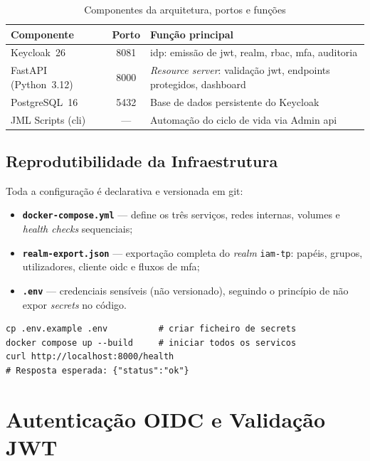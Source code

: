 \begin{table}[h!]
\centering
\caption{Componentes da arquitetura, portos e funções}
\label{tab:componentes}
\begin{tabular}{|l|c|l|}
\hline
\textbf{Componente} & \textbf{Porto} & \textbf{Função principal} \\ \hline
Keycloak~26 & 8081 & \gls{idp}: emissão de \gls{jwt}, realm, \gls{rbac}, \gls{mfa}, auditoria \\ \hline
FastAPI (Python~3.12) & 8000 & \textit{Resource server}: validação \gls{jwt}, endpoints protegidos, dashboard \\ \hline
PostgreSQL~16 & 5432 & Base de dados persistente do Keycloak \\ \hline
JML Scripts (\gls{cli}) & — & Automação do ciclo de vida via Admin \gls{api} \\ \hline
\end{tabular}
\end{table}

\subsection{Reprodutibilidade da Infraestrutura}

Toda a configuração é declarativa e versionada em git:

\begin{itemize}
  \item \textbf{\texttt{docker-compose.yml}} — define os três serviços, redes internas, volumes e \textit{health checks} sequenciais;
  \item \textbf{\texttt{realm-export.json}} — exportação completa do \textit{realm} \texttt{iam-tp}: papéis, grupos, utilizadores, cliente \gls{oidc} e fluxos de \gls{mfa};
  \item \textbf{\texttt{.env}} — credenciais sensíveis (não versionado), seguindo o princípio de não expor \textit{secrets} no código.
\end{itemize}

\begin{lstlisting}[caption={Arranque completo da infraestrutura (primeira execução: 2--3 min)},label={lst:docker}]
cp .env.example .env          # criar ficheiro de secrets
docker compose up --build     # iniciar todos os servicos
curl http://localhost:8000/health
# Resposta esperada: {"status":"ok"}
\end{lstlisting}

\section{Autenticação OIDC e Validação JWT}
\label{sec:autenticacao}

